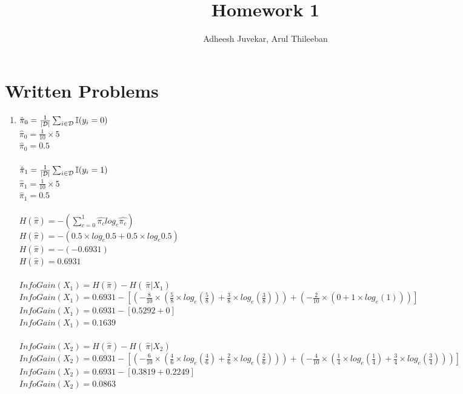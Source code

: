 \documentclass[12pt,a4paper]{article}
\author{Adheesh Juvekar, Arul Thileeban}
\begin{document}
\title{Homework 1}
\maketitle

\section*{Written Problems}
\begin{enumerate}
    \item 
    $\hat{\pi}_0 = \frac{1}{\left| \cal D \right|}\sum_{i\in\cal D}{\mathbb{I}(y_i = 0)}$\\
    $\hat{\pi}_0 = \frac{1}{10} \times 5$\\
    $\hat{\pi}_0 = 0.5$\\\\
    $\hat{\pi}_1 = \frac{1}{\left| \cal D \right|}\sum_{i\in\cal D}{\mathbb{I}(y_i = 1)}$\\
    $\hat{\pi}_1 = \frac{1}{10} \times 5$\\
    $\hat{\pi}_1 = 0.5$\\\\
    $H\left(\hat{\pi}\right) = -\left( \sum_{c=0}^{1}{\hat{\pi_c}log_e\hat{\pi_c}} \right) $\\
    $H\left(\hat{\pi}\right) = -\left( 0.5 \times log_e0.5 + 0.5 \times log_e0.5 \right)$\\
    $H\left(\hat{\pi}\right) = -\left( -0.6931 \right)$\\
    $H\left(\hat{\pi}\right) = 0.6931$\\\\
    $InfoGain(X_1) = H\left( \hat{\pi} \right)-H\left(\ \hat{\pi} | X_1 \right)$\\
    $InfoGain(X_1) = 0.6931 - \left[ \left( -\frac{8}{10}\times\left( \frac{5}{8}\times log_e(\frac{5}{8})+\frac{3}{8}\times log_e(\frac{3}{8}) \right) \right)+ \left( -\frac{2}{10}\times\left( 0+1\times log_e(1) \right) \right) \right] $\\
	$InfoGain(X_1) = 0.6931 - \left[ 0.5292 + 0 \right]$\\
	$InfoGain(X_1) = 0.1639$\\\\
	 
    $InfoGain(X_2) = H\left( \hat{\pi} \right)-H\left(\ \hat{\pi} | X_2 \right)$\\
    $InfoGain(X_2) = 0.6931 - \left[ \left( -\frac{6}{10}\times\left( \frac{4}{6}\times log_e(\frac{4}{6})+\frac{2}{6}\times log_e(\frac{2}{6}) \right) \right)+ \left( -\frac{4}{10}\times\left( \frac{1}{4}\times log_e(\frac{1}{4})+\frac{3}{4}\times log_e(\frac{3}{4}) \right) \right) \right] $\\
	$InfoGain(X_2) = 0.6931 - \left[ 0.3819 + 0.2249 \right]$\\
	$InfoGain(X_2) = 0.0863$\\\\
	

\end{enumerate}
\end{document}
